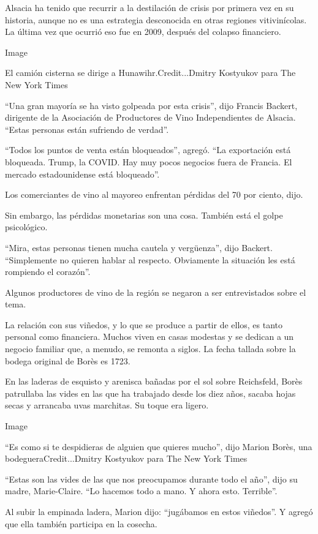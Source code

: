 Alsacia ha tenido que recurrir a la destilación de crisis por primera
vez en su historia, aunque no es una estrategia desconocida en otras
regiones vitivinícolas. La última vez que ocurrió eso fue en 2009,
después del colapso financiero.

Image

El camión cisterna se dirige a Hunawihr.Credit...Dmitry Kostyukov para
The New York Times

``Una gran mayoría se ha visto golpeada por esta crisis'', dijo Francis
Backert, dirigente de la Asociación de Productores de Vino
Independientes de Alsacia. ``Estas personas están sufriendo de verdad''.

``Todos los puntos de venta están bloqueados'', agregó. ``La exportación
está bloqueada. Trump, la COVID. Hay muy pocos negocios fuera de
Francia. El mercado estadounidense está bloqueado''.

Los comerciantes de vino al mayoreo enfrentan pérdidas del 70 por
ciento, dijo.

Sin embargo, las pérdidas monetarias son una cosa. También está el golpe
psicológico.

``Mira, estas personas tienen mucha cautela y vergüenza'', dijo Backert.
``Simplemente no quieren hablar al respecto. Obviamente la situación les
está rompiendo el corazón''.

Algunos productores de vino de la región se negaron a ser entrevistados
sobre el tema.

La relación con sus viñedos, y lo que se produce a partir de ellos, es
tanto personal como financiera. Muchos viven en casas modestas y se
dedican a un negocio familiar que, a menudo, se remonta a siglos. La
fecha tallada sobre la bodega original de Borès es 1723.

En las laderas de esquisto y arenisca bañadas por el sol sobre
Reichsfeld, Borès patrullaba las vides en las que ha trabajado desde los
diez años, sacaba hojas secas y arrancaba uvas marchitas. Su toque era
ligero.

Image

``Es como si te despidieras de alguien que quieres mucho'', dijo Marion
Borès, una bodegueraCredit...Dmitry Kostyukov para The New York Times

``Estas son las vides de las que nos preocupamos durante todo el año'',
dijo su madre, Marie-Claire. ``Lo hacemos todo a mano. Y ahora esto.
Terrible''.

Al subir la empinada ladera, Marion dijo: ``jugábamos en estos
viñedos''. Y agregó que ella también participa en la cosecha.

